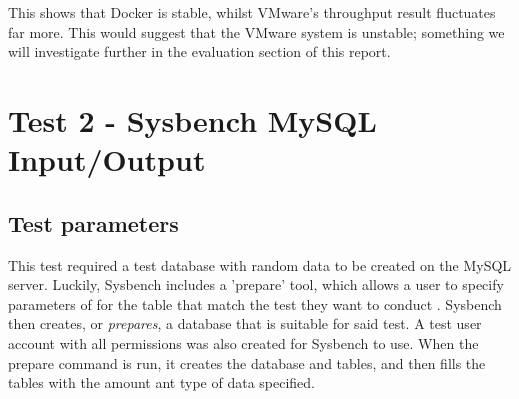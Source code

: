 \begin{figure}[H]
\caption{}
\label{fig:test1graphs}
\centering
\end{figure}

This shows that Docker is stable, whilst VMware's throughput result fluctuates far more. This would suggest that the VMware system is unstable; something we will investigate further in the evaluation section of this report.

\section{Test 2 - Sysbench MySQL Input/Output}
\subsection{Test parameters}
This test required a test database with random data to be created on the MySQL server. Luckily, Sysbench includes a 'prepare' tool, which allows a user to specify parameters of for the table that match the test they want to conduct \citep{sysbench}. Sysbench then creates, or \emph{prepares}, a database that is suitable for said test. A test user account with all permissions was also created for Sysbench to use. When the prepare command is run, it creates the database and tables, and then fills the tables with the amount ant type of data specified.


